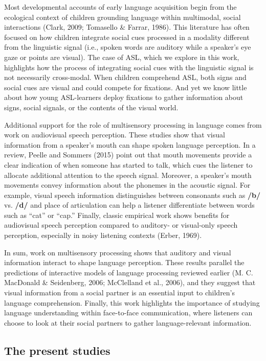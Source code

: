 \documentclass[,man,floatsintext]{apa6}
\begin{document}
Most developmental accounts of early language acquisition begin from the
ecological context of children grounding language within multimodal,
social interactions (Clark, 2009; Tomasello \& Farrar, 1986). This
literature has often focused on how children integrate social cues
processed in a modality different from the linguistic signal (i.e.,
spoken words are auditory while a speaker's eye gaze or points are
visual). The case of ASL, which we explore in this work, highlights how
the process of integrating social cues with the linguistic signal is not
necessarily cross-modal. When children comprehend ASL, both signs and
social cues are visual and could compete for fixations. And yet we know
little about how young ASL-learners deploy fixations to gather
information about signs, social signals, or the contents of the visual
world.

Additional support for the role of multisensory processing in language
comes from work on audiovisual speech perception. These studies show
that visual information from a speaker's mouth can shape spoken language
perception. In a review, Peelle and Sommers (2015) point out that mouth
movements provide a clear indication of when someone has started to
talk, which cues the listener to allocate additional attention to the
speech signal. Moreover, a speaker's mouth movements convey information
about the phonemes in the acoustic signal. For example, visual speech
information distinguishes between consonants such as \textbf{/b/} vs.
\textbf{/d/} and place of articulation can help a listener differentiate
between words such as \enquote{cat} or \enquote{cap.} Finally, classic
empirical work shows benefits for audiovisual speech perception compared
to auditory- or visual-only speech perception, especially in noisy
listening contexts (Erber, 1969).

In sum, work on multisensory processing shows that auditory and visual
information interact to shape language perception. These results
parallel the predictions of interactive models of language processing
reviewed earlier (M. C. MacDonald \& Seidenberg, 2006; McClelland et
al., 2006), and they suggest that visual information from a social
partner is an essential input to children's language comprehension.
Finally, this work highlights the importance of studying language
understanding within face-to-face communication, where listeners can
choose to look at their social partners to gather language-relevant
information.

\subsection{The present studies}\label{the-present-studies}
\end{document}
